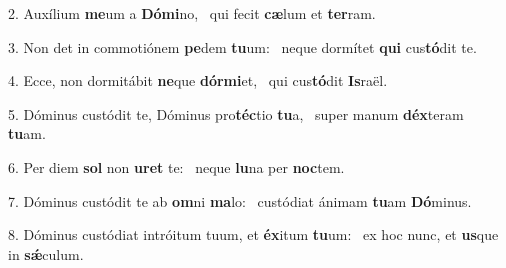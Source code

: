 2. Auxílium \textbf{me}um a \textbf{Dó}\textbf{mi}no, \ast\  qui fecit \textbf{cæ}lum et \textbf{ter}ram.\

3. Non det in commotiónem \textbf{pe}dem \textbf{tu}um: \ast\  neque dormítet \textbf{qui} cus\textbf{tó}dit te.\

4. Ecce, non dormitábit \textbf{ne}que \textbf{dór}\textbf{mi}et, \ast\  qui cus\textbf{tó}dit \textbf{Is}raël.\

5. Dóminus custódit te, Dóminus pro\textbf{téc}tio \textbf{tu}a, \ast\  super manum \textbf{déx}teram \textbf{tu}am.\

6. Per diem \textbf{sol} non \textbf{u}\textbf{ret} te: \ast\  neque \textbf{lu}na per \textbf{noc}tem.\

7. Dóminus custódit te ab \textbf{om}ni \textbf{ma}lo: \ast\  custódiat ánimam \textbf{tu}am \textbf{Dó}minus.\

8. Dóminus custódiat intróitum tuum, et \textbf{éx}itum \textbf{tu}um: \ast\  ex hoc nunc, et \textbf{us}que in \textbf{sǽ}culum.\

